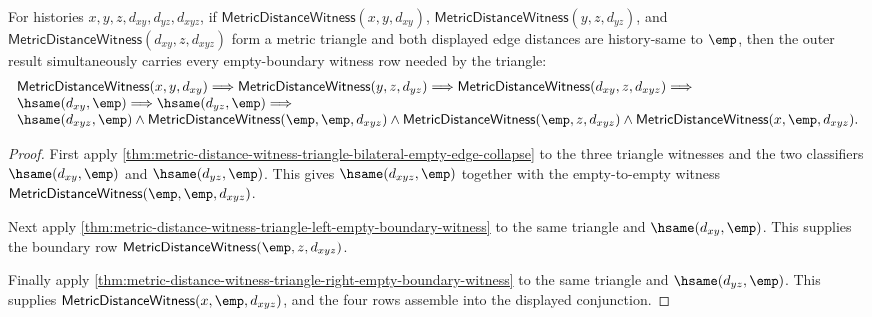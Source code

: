 \begin{theorem}
\label{thm:metric-distance-witness-two-sided-empty-triangle-witness-exactness}
For histories $x,y,z,d_{xy},d_{yz},d_{xyz}$, if
$\mathsf{MetricDistanceWitness}(x,y,d_{xy})$,
$\mathsf{MetricDistanceWitness}(y,z,d_{yz})$, and
$\mathsf{MetricDistanceWitness}(d_{xy},z,d_{xyz})$ form a metric triangle and
both displayed edge distances are history-same to $\emp$, then the outer result
simultaneously carries every empty-boundary witness row needed by the triangle:
$$
\begin{array}{l}
\mathsf{MetricDistanceWitness}(x,y,d_{xy})\Longrightarrow
\mathsf{MetricDistanceWitness}(y,z,d_{yz})\Longrightarrow
\mathsf{MetricDistanceWitness}(d_{xy},z,d_{xyz})\Longrightarrow\\
\hsame(d_{xy},\emp)\Longrightarrow
\hsame(d_{yz},\emp)\Longrightarrow\\
\hsame(d_{xyz},\emp)\land
\mathsf{MetricDistanceWitness}(\emp,\emp,d_{xyz})\land
\mathsf{MetricDistanceWitness}(\emp,z,d_{xyz})\land
\mathsf{MetricDistanceWitness}(x,\emp,d_{xyz}).
\end{array}
$$
\end{theorem}
\begin{proof}
First apply
\autoref{thm:metric-distance-witness-triangle-bilateral-empty-edge-collapse} to
the three triangle witnesses and the two classifiers
$\hsame(d_{xy},\emp)$ and $\hsame(d_{yz},\emp)$. This gives
$\hsame(d_{xyz},\emp)$ together with the empty-to-empty witness
$\mathsf{MetricDistanceWitness}(\emp,\emp,d_{xyz})$.

Next apply
\autoref{thm:metric-distance-witness-triangle-left-empty-boundary-witness} to
the same triangle and $\hsame(d_{xy},\emp)$. This supplies the boundary row
$\mathsf{MetricDistanceWitness}(\emp,z,d_{xyz})$.

Finally apply
\autoref{thm:metric-distance-witness-triangle-right-empty-boundary-witness} to
the same triangle and $\hsame(d_{yz},\emp)$. This supplies
$\mathsf{MetricDistanceWitness}(x,\emp,d_{xyz})$, and the four rows assemble
into the displayed conjunction.
\end{proof}
